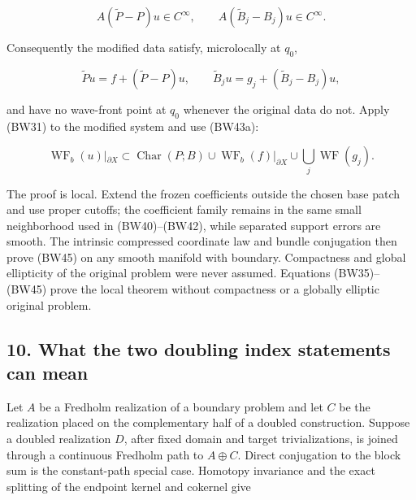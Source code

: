 \documentclass[
  11pt,
]{article}
\makeatletter
\let\ReaderOriginalAnchorStart\hyper@anchorstart
\let\ReaderOriginalAnchorEnd\hyper@anchorend
\let\ReaderPendingAliases\@empty
\def\ReaderArmAliases#1{\gdef\ReaderPendingAliases{#1}}
\def\hyper@anchorstart#1{\ReaderIfNativeAnchorTF{#1}{\ReaderPendingAliases\global\let\ReaderPendingAliases\@empty}{}\ReaderOriginalAnchorStart{#1}}
\makeatother
\begin{document}
\[
 A(\widetilde P-P)u\in C^\infty,\qquad
 A(\widetilde B_j-B_j)u\in C^\infty.
 \tag{BW43a}
\]

Consequently the modified data satisfy, microlocally at \(q_0\),

\[
 \widetilde Pu=f+(\widetilde P-P)u,\qquad
 \widetilde B_ju=g_j+(\widetilde B_j-B_j)u,
 \tag{BW44}
\]

and have no wave-front point at \(q_0\) whenever the original data do
not. Apply (BW31) to the modified system and use (BW43a):

\[
 \boxed{\operatorname{WF}_b(u)|_{\partial X}
 \subset\operatorname{Char}(P;B)
 \cup\operatorname{WF}_b(f)|_{\partial X}
 \cup\bigcup_j\operatorname{WF}(g_j).}
 \tag{BW45}
\]

The proof is local. Extend the frozen coefficients outside the chosen
base patch and use proper cutoffs; the coefficient family remains in the
same small neighborhood used in (BW40)--(BW42), while separated support
errors are smooth. The intrinsic compressed coordinate law and bundle
conjugation then prove (BW45) on any smooth manifold with boundary.
Compactness and global ellipticity of the original problem were never
assumed. Equations (BW35)--(BW45) prove the local theorem without
compactness or a globally elliptic original problem.

\ReaderArmAliases{\ReaderOriginalAnchorStart{AN03-BWF-010}\ReaderOriginalAnchorEnd\begingroup\expandafter\def\csname @currentHref\endcsname{AN03-BWF-010}\label{AN03-BWF-010}\endgroup\ReaderOriginalAnchorStart{10-what-the-two-doubling-index-statements-can-mean}\ReaderOriginalAnchorEnd\begingroup\expandafter\def\csname @currentHref\endcsname{10-what-the-two-doubling-index-statements-can-mean}\label{10-what-the-two-doubling-index-statements-can-mean}\endgroup}
\subsection{10. What the two doubling index statements can
mean}\label{what-the-two-doubling-index-statements-can-mean}

Let \(A\) be a Fredholm realization of a boundary problem and let \(C\)
be the realization placed on the complementary half of a doubled
construction. Suppose a doubled realization \(D\), after fixed domain
and target trivializations, is joined through a continuous Fredholm path
to \(A\oplus C\). Direct conjugation to the block sum is the
constant-path special case. Homotopy invariance and the exact splitting
of the endpoint kernel and cokernel give
\end{document}
